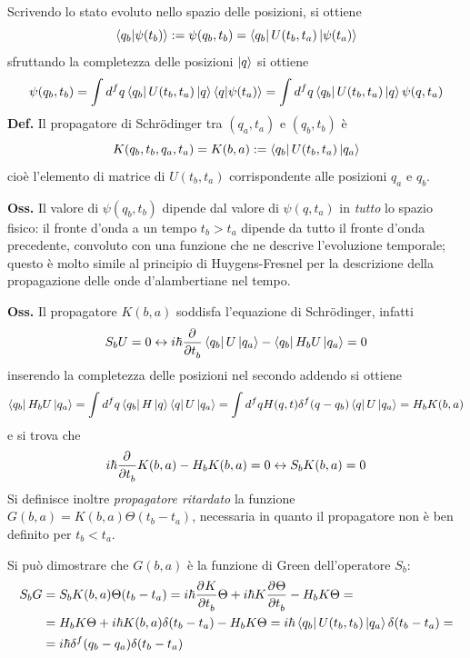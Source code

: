 Scrivendo lo stato evoluto nello spazio delle posizioni, si ottiene
$$\bra{q_b}\ket{\psi(t_b)}:=\psi(q_b,t_b) = \bra{q_b}U(t_b,t_a)\ket{\psi(t_a)}$$
sfruttando la completezza delle posizioni $\ket{q}$ si ottiene
\begin{equation}
\psi(q_b,t_b) = \int d^fq\bra{q_b}U(t_b,t_a)\ket{q}\bra{q}\ket{\psi(t_a)} = 
\int d^fq\bra{q_b}U(t_b,t_a)\ket{q}\psi(q,t_a)
\label{eq:K_def}
\end{equation}
\textbf{Def.} Il propagatore di Schrödinger tra $(q_a,t_a)$ e $(q_b,t_b)$ è
$$K(q_b,t_b,q_a,t_a) = K(b,a) := \bra{q_b}U(t_b,t_a)\ket{q_a}$$
cioè l'elemento di matrice di $U(t_b,t_a)$ corrispondente alle posizioni $q_a$ e $q_b$.

\textbf{Oss.} Il valore di $\psi(q_b,t_b)$ dipende dal valore di $\psi(q,t_a)$ in \textit{tutto} lo spazio
fisico: il fronte d'onda a un tempo $t_b>t_a$ dipende da tutto il fronte d'onda precedente, convoluto con
una funzione che ne descrive l'evoluzione temporale; questo è molto simile al principio di Huygens-Fresnel
per la descrizione della propagazione delle onde d'alambertiane nel tempo.

\textbf{Oss.} Il propagatore $K(b,a)$ soddisfa l'equazione di Schrödinger, infatti
$$S_bU=0\leftrightarrow i\hbar\pdv[]{}{t_b}\bra{q_b}U\ket{q_a}-\bra{q_b}H_bU\ket{q_a}=0$$
inserendo la completezza delle posizioni nel secondo addendo si ottiene
$$\bra{q_b}H_bU\ket{q_a} = \int d^fq \bra{q_b}H\ket{q}\bra{q}U\ket{q_a} = 
\int d^fq H(q,t)\delta^f(q-q_b)\bra{q}U\ket{q_a} = H_bK(b,a)$$
e si trova che
$$i\hbar\pdv[]{}{t_b}K(b,a) - H_bK(b,a)=0 \leftrightarrow S_bK(b,a)=0$$
Si definisce inoltre \textit{propagatore ritardato} la funzione $G(b,a) = K(b,a)\Theta(t_b-t_a)$, necessaria
in quanto il propagatore non è ben definito per $t_b<t_a$.

\noindent{}

Si può dimostrare che $G(b,a)$ è la funzione di Green dell'operatore $S_b$:
\begin{align*}	
    S_bG&=S_bK(b,a)\Theta(t_b-t_a) = i\hbar\pdv[]{K}{t_b}\Theta + i\hbar K\pdv[]{\Theta}{t_b} -H_bK\Theta =\\
    &=H_bK\Theta+i\hbar K(b,a)\delta(t_b-t_a)-H_bK\Theta=i\hbar\bra{q_b}U(t_b,t_b)\ket{q_a}\delta(t_b-t_a)=\\
    &=i\hbar\delta^f(q_b-q_a)\delta(t_b-t_a)
\end{align*}

